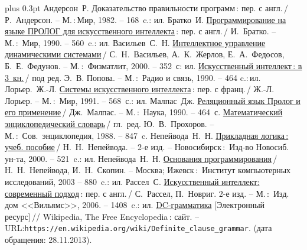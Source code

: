\documentclass[14pt, a4paper, openany, twoside, final]{extbook} %
\def\emphbib#1{#1}
\begin{document}
\begin{thebibliography}{99}\itemsep1pt \parskip 0pt plus 0.3pt
 Андерсон~Р. \emphbib{Доказательство правильности программ}\,{}: пер. с англ.\,{}/ Р.~Андерсон. -- М.\,:\,Мир, 1982. -- 168~c.: ил.
 Братко~И. \emphbib{\href{http://royallib.ru/book/bratko_ivan/programmirovanie_na_yazike_prolog_dlya_iskusstvennogo_intellekta.html}{Программирование на языке ПРОЛОГ для искусственного интеллекта}}\,{}: пер. с англ.\,/ И.~Братко. -- М.\,:~Мир, 1990. -- 560~c.: ил.
 Васильев~С.~Н. \emphbib{\href{http://bookfi.org/book/616050}{Интеллектное управление динамическими системами}}\,{}/ С.~Н.~Васильев, А.~К.~Жерлов, Е.~А.~Федосов, Б.~Е.~Федунов. -- М.\,:~Физматлит, 2000. -- 352~с: ил.
 \emphbib{\href{http://aihandbook.intsys.org.ru/index.php/intro/ai-handbook}{Искусственный интеллект\,{}: в 3~кн.}}\,{}/ под ред. Э.~В. Попова. -- М.\,:~Радио и связь, 1990. -- 464 c.:\,{}ил.
 Лорьер.~Ж.-Л.  \emphbib{\href{http://publ.lib.ru/ARCHIVES/L/LOR'ER_Jan_Lui/_Lor'er_J.L..html}{Системы искусственного интеллекта}\,{}: пер. с франц.}\,{}/ Ж.-Л. Лорьер. -- М.\,:~Мир, 1991. -- 568~с.: ил.
 Малпас~Дж. \emphbib{\href{http://padaread.com/?book=40731&pg=1}{Реляционный язык Пролог и его применение}}\,{}/ Дж.~Малпас. -- М.\,:~Наука, 1990. -- 464~с.
 \emphbib{\href{https://app.box.com/shared/793ukgvblxmj0hh6btw4}{Математический энциклопедический словарь}}\,{}/ гл.~ред. Ю.~В.~Прохоров. -- М.\,:~Сов.~энциклопедия, 1988. -- 847~c.
 Непейвода~Н.~Н. \emphbib{\href{http://www.logic-books.info/taxonomy/term/215}{Прикладная логика\,{}: учеб. пособие}}\,{}/ Н.~Н.~Непейвода. -- 2-е изд. -- Новосибирск\,{}:~Изд-во Новосиб. ун-та, 2000. -- 521~c.: ил.
 Непейвода~Н.~Н.  \emphbib{\href{http://philosophy.ru/library/logic_math/library/nepeivoda_prog.pdf}{Основания программирования}}\,{}/ Н.~Н.~Непейвода, И.~Н.~Скопин. -- Москва; Ижевск\,{}:~Институт компьютерных исследований, 2003 -- 880~c.: ил.
 Рассел~С. \href{http://www.aiportal.ru/downloads/books/ai-modern-approach-2-edition-by-rassel-norvig.html}{Искусственный интеллект: современный подход}\,{}: пер. с англ.\,{}/ С.~Рассел, П.~Новриг. 2-е изд. -- М.\,:~Изд. дом <<Вильямс>>, 2006. -- 1408~c.: ил.
 \emphbib{\href{https://en.wikipedia.org/wiki/Definite_clause_grammar}{DC-грамматика}} [Электронный ресурс]\,{}// Wikipedia, The Free Encyclopedia\,{}: сайт. -- URL:\texttt{https://en.wikipedia.org/wiki/Definite\_clause\linebreak\_grammar}. (дата обращения: 28.11.2013).

\end{thebibliography}
\end{document}
